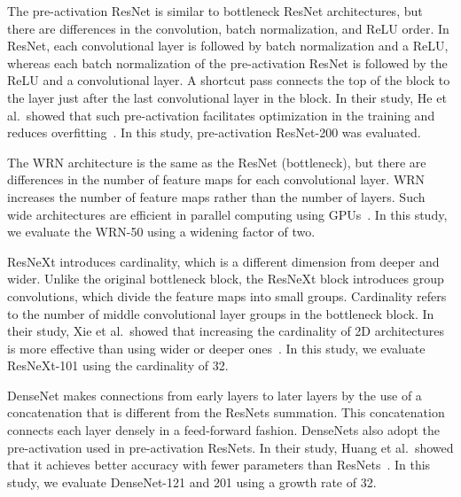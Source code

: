 \documentclass[10pt,twocolumn,letterpaper]{article}
\begin{document}
    The pre-activation ResNet is similar to bottleneck ResNet architectures,
    but there are differences in the convolution, batch normalization, and ReLU order.
    In ResNet, each convolutional layer is followed by batch normalization and a ReLU,
    whereas each batch normalization of the pre-activation ResNet is followed by the ReLU and a convolutional layer.
    A shortcut pass connects the top of the block to the layer just after the last convolutional layer in the block.
    In their study, He et al.\ showed that such pre-activation facilitates optimization in the training and reduces overfitting~\cite{He2016}.
    In this study, pre-activation ResNet-200 was evaluated.

    The WRN architecture is the same as the ResNet (bottleneck),
    but there are differences in the number of feature maps for each convolutional layer.
    WRN increases the number of feature maps rather than the number of layers.
    Such wide architectures are efficient in parallel computing using GPUs~\cite{WideResNet}.
    In this study, we evaluate the WRN-50 using a widening factor of two.
    
    ResNeXt introduces cardinality, which is a different dimension from deeper and wider.
    Unlike the original bottleneck block, the ResNeXt block introduces group convolutions,
    which divide the feature maps into small groups.
    Cardinality refers to the number of middle convolutional layer groups in the bottleneck block.
    In their study, Xie et al.\ showed that
    increasing the cardinality of 2D architectures is more effective than using wider or deeper ones~\cite{resnext}.
    In this study, we evaluate ResNeXt-101 using the cardinality of 32.

    DenseNet makes connections from early layers to later layers by
    the use of a concatenation that is different from the ResNets summation.
    This concatenation connects each layer densely in a feed-forward fashion.
    DenseNets also adopt the pre-activation used in pre-activation ResNets.
    In their study, Huang et al.\ showed that it achieves better accuracy with fewer parameters than ResNets~\cite{densenets}.
    In this study, we evaluate DenseNet-121 and 201 using a growth rate of 32.
\end{document}
